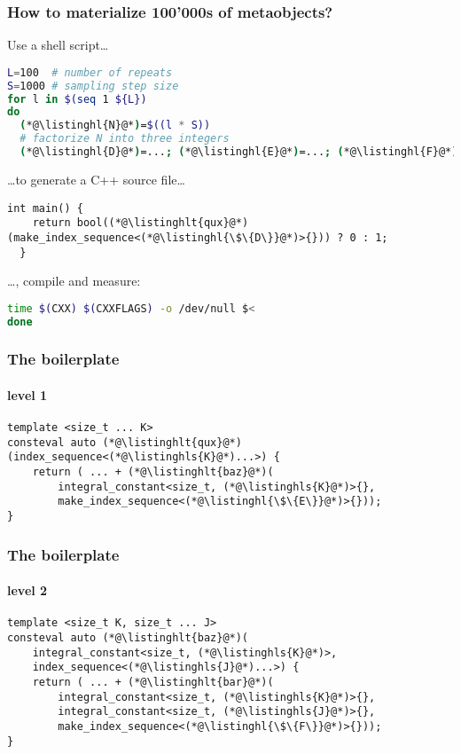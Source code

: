 \documentclass[compress,table,xcolor=table]{beamer}
\begin{document}
\begin{frame}[fragile]
  \frametitle{How to materialize 100'000s of metaobjects?}
  Use a shell script\ldots
  \begin{lstlisting}[language=bash,basicstyle=\scriptsize\ttfamily]
L=100  # number of repeats
S=1000 # sampling step size
for l in $(seq 1 ${L})
do
  (*@\listinghl{N}@*)=$((l * S))
  # factorize N into three integers
  (*@\listinghl{D}@*)=...; (*@\listinghl{E}@*)=...; (*@\listinghl{F}@*)=...
  \end{lstlisting}
  \ldots to generate a C++ source file\ldots
  \begin{lstlisting}[language=c++2x,basicstyle=\scriptsize\ttfamily]
  int main() {
    return bool((*@\listinghlt{qux}@*)(make_index_sequence<(*@\listinghl{\$\{D\}}@*)>{})) ? 0 : 1;
  }
  \end{lstlisting}
  \ldots, compile and measure:
  \begin{lstlisting}[language=bash,basicstyle=\scriptsize\ttfamily]
  time $(CXX) $(CXXFLAGS) -o /dev/null $<
done
  \end{lstlisting}
\end{frame}
\begin{frame}[fragile]
  \frametitle{The boilerplate}
  \framesubtitle{level 1}
  \begin{lstlisting}[language=c++2x,basicstyle=\normalsize\ttfamily]
template <size_t ... K>
consteval auto (*@\listinghlt{qux}@*)(index_sequence<(*@\listinghls{K}@*)...>) {
	return ( ... + (*@\listinghlt{baz}@*)(
		integral_constant<size_t, (*@\listinghls{K}@*)>{},
		make_index_sequence<(*@\listinghl{\$\{E\}}@*)>{}));
}
  \end{lstlisting}
\end{frame}
\begin{frame}[fragile]
  \frametitle{The boilerplate}
  \framesubtitle{level 2}
  \begin{lstlisting}[language=c++2x,basicstyle=\normalsize\ttfamily]
template <size_t K, size_t ... J>
consteval auto (*@\listinghlt{baz}@*)(
	integral_constant<size_t, (*@\listinghls{K}@*)>,
	index_sequence<(*@\listinghls{J}@*)...>) {
	return ( ... + (*@\listinghlt{bar}@*)(
		integral_constant<size_t, (*@\listinghls{K}@*)>{},
		integral_constant<size_t, (*@\listinghls{J}@*)>{},
		make_index_sequence<(*@\listinghl{\$\{F\}}@*)>{}));
}
  \end{lstlisting}
\end{frame}
\end{document}
